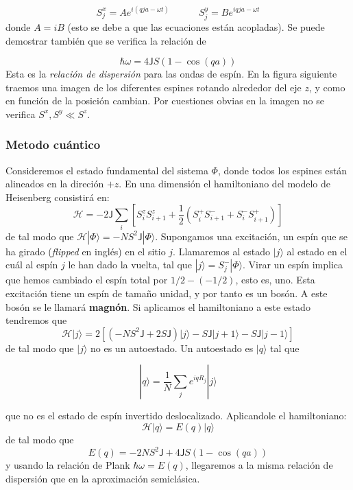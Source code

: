 \documentclass[12pt,a4paper]{book}
\numberwithin{equation}{section}
\numberwithin{figure}{section}
\newcommand{\tquad}{\quad \quad \quad}
\newcommand{\parentesis}[1]{\left( #1  \right)}
\newcommand{\ccorchetes}[1]{\left[ #1  \right]}
\newcommand{\Hcal}{\mathcal{H}}
\newcommand{\Jsf}{\mathsf{J}}
\begin{document}
\begin{equation}
    S_j^x = A e^{i(qja-\omega t)} \tquad S_j^y = B e^{i qja-\omega t}
\end{equation}
donde $A=iB$ (esto se debe a que las ecuaciones están acopladas). Se puede demostrar también que se verifica la relación de

\begin{equation}
    \hbar \omega = 4 \Jsf S (1- \cos (qa))
\end{equation}
Esta es la \textit{relación de dispersión} para las ondas de espín. En la figura siguiente traemos una imagen de los diferentes espines rotando alrededor del eje $z$, y como en función de la posición cambian. Por cuestiones obvias en la imagen no se verifica $S^x,S^y \ll S^z$. \\


\subsubsection{Metodo cuántico}
Consideremos el estado fundamental del sistema $\Phi$, donde todos los espines están alineados en la direción $+z$. En una dimensión el hamiltoniano del modelo de Heisenberg consistirá en:
\begin{equation}
    \Hcal = - 2\Jsf \sum_i \ccorchetes{S_i^z S_{i+1}^z + \frac{1}{2} \parentesis{S_i^+ S_{i+1}^- + S_i^- S_{i+1}^+}}
\end{equation}
de tal modo que $\Hcal  |\Phi\rangle=-NS^2\Jsf |\Phi\rangle$. Supongamos una excitación, un espín que se ha girado (\textit{flipped} en inglés) en el sitio $j$. Llamaremos al estado $|j\rangle$ al estado en el cuál al espín $j$ le han dado la vuelta, tal que $|j\rangle = S_j^- |\Phi\rangle$. Virar un espín implica que hemos cambiado el espín total por $1/2-(-1/2)$, esto es, uno. Esta excitación tiene un espín de tamaño unidad, y por tanto es un bosón. A este bosón se le llamará \textbf{magnón}. Si aplicamos el hamiltoniano a este estado tendremos que
\begin{equation}
    \Hcal |j\rangle = 2 \ccorchetes{(-NS^2\Jsf+2S\Jsf)|j\rangle - S\Jsf |j+1\rangle - S\Jsf|j-1\rangle}
\end{equation} 
de tal modo que $|j\rangle$ no es un autoestado. Un autoestado es $|q\rangle$ tal que

\begin{equation}
    |q\rangle = \frac{1}{N} \sum_j e^{i q R_j} |j\rangle
\end{equation}

que no es el estado de espín invertido deslocalizado. Aplicandole el hamiltoniano:
\begin{equation} 
    \Hcal |q\rangle = E(q) |q\rangle 
\end{equation}
de tal modo que
\begin{equation}
    E(q) = - 2 NS^2 \Jsf + 4 \Jsf S (1- \cos (qa)) \label{Ec:06-06-12}
\end{equation}
y usando la relación de Plank $\hbar \omega = E(q)$, llegaremos a la misma relación de dispersión que en la aproximación semiclásica. 
\end{document}
